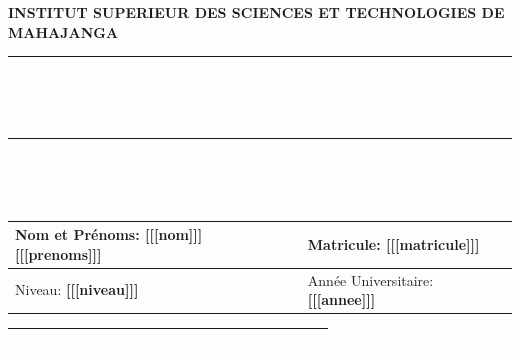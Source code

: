 \documentclass[a4paper, 10pt]{article}
\begin{document}
\centering \uppercase{\textbf{institut superieur des sciences et technologies de mahajanga}}\\
\centering \rule{0.4\textwidth}{0.5pt}\\
\begin{spacing}{1.5}
	\\
\end{spacing}
\centering \rule{0.4\textwidth}{0.5pt}\\
%
%
%
\begin{spacing}{1.5}
	\\
\end{spacing}
%
%
%
\centering
\begin{tabularx}{\textwidth}{|X|X|}
	\hline
	Nom et Prénoms: \textbf{[[[nom]]] [[[prenoms]]]} & Matricule: \textbf{[[[matricule]]]}       \\ \hline
	Niveau: \textbf{[[[niveau]]]}                    & Année Universitaire: \textbf{[[[annee]]]} \\	\hline
\end{tabularx}
%
%
\centering
\begin{tabularx}{\textwidth}{|b|s|s|}
	\hline
	 \textcolor{white}{\textbf{Unité d'Enseignement/EC}} &  \textcolor{white}{\textbf{Crédits}} &  \textcolor{white}{\textbf{Notes}} \\ \hline
	
\end{tabularx}
\end{document}
